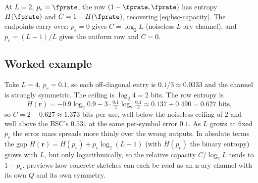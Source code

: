 At $L = 2$, $p_e = \fprate$, the row $(1 - \fprate, \fprate)$ has entropy
$H(\fprate)$ and $C = 1 - H(\fprate)$, recovering \eqref{eq:bsc-capacity}. The
endpoints carry over: $p_e = 0$ gives $C = \log_2 L$ (noiseless $L$-ary
channel), and $p_e = (L-1)/L$ gives the uniform row and $C = 0$.

\subsection*{Worked example}

Take $L = 4$, $p_e = 0.1$, so each off-diagonal entry is $0.1/3 \approx 0.0333$
and the channel is strongly symmetric. The ceiling is $\log_2 4 = 2$ bits. The
row entropy is
\[
  H(\mathbf{r}) = -0.9 \log_2 0.9 - 3 \cdot \tfrac{0.1}{3} \log_2 \tfrac{0.1}{3}
  \approx 0.137 + 0.490 = 0.627 \text{ bits,}
\]
so $C = 2 - 0.627 \approx 1.373$ bits per use, well below the noiseless ceiling
of $2$ and well above the BSC's $0.531$ at the same per-symbol error $0.1$. As
$L$ grows at fixed $p_e$ the error mass spreads more thinly over the wrong
outputs. In absolute terms the gap $H(\mathbf{r}) = H(p_e) + p_e
\log_2(L-1)$ (with $H(p_e)$ the binary entropy) grows with $L$, but only logarithmically, so the relative capacity
$C/\log_2 L$ tends to $1 - p_e$. 
previews how concrete sketches can each be read as an n-ary channel with its
own $Q$ and its own symmetry.
